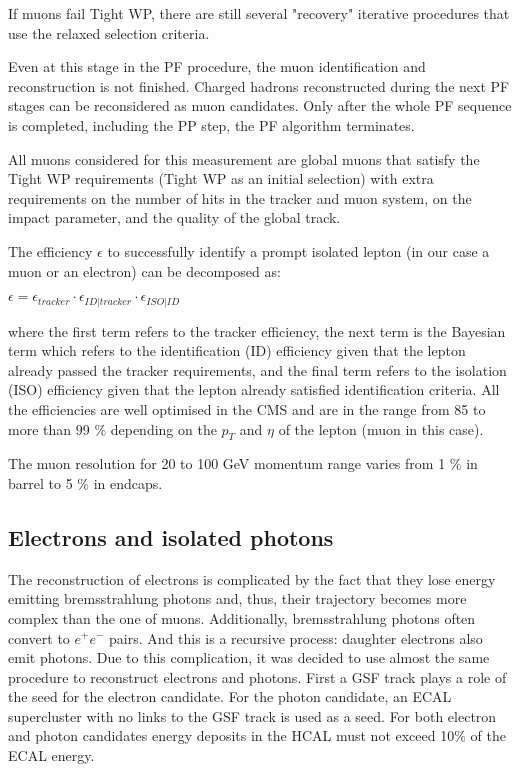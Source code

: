 \begin{small}
If muons fail Tight WP, there are still several "recovery" iterative procedures that use the relaxed selection criteria. 

Even at this stage in the PF procedure, the muon identification and reconstruction is not finished. Charged hadrons reconstructed during the next PF stages can be reconsidered as muon candidates. Only after the whole PF sequence is completed, including the PP step, the PF algorithm terminates.

All muons considered for this measurement are global muons that satisfy the Tight WP requirements (Tight WP as an initial selection) with extra requirements on the number of hits in the tracker and muon system, on the impact parameter, and the quality of the global track. 

The efficiency $\epsilon$ to successfully identify a prompt isolated lepton (in our case a muon or an electron) can be decomposed as:

$\epsilon = \epsilon_{tracker} \cdot \epsilon_{ID | tracker} \cdot \epsilon_{ISO | ID} $

\noindent where the first term refers to the tracker efficiency, the next term is the Bayesian term which refers to the identification (ID) efficiency given that the lepton already passed the tracker requirements, and the final term refers to the isolation (ISO) efficiency given that the lepton already satisfied identification criteria. All the efficiencies are well optimised in the CMS and are in the range from 85 to more than 99 $\%$ depending on the $p_T$ and $\eta$ of the lepton (muon in this case). 

The muon resolution for 20 to 100 GeV momentum range varies from 1 $\%$ in barrel to 5 $\%$ in endcaps.

\subsection{Electrons and isolated photons}\label{sec:electrons}

The reconstruction of electrons is complicated by the fact that they lose energy emitting bremsstrahlung photons and, thus, their trajectory becomes more complex than the one of muons. Additionally, bremsstrahlung photons often convert to $e^+ e^-$ pairs. And this is a recursive process: daughter electrons also emit photons. Due to this complication, it was decided to use almost the same procedure to reconstruct electrons and photons. First a GSF track plays a role of the seed for the electron candidate. For the photon candidate, an ECAL supercluster with no links to the GSF track is used as a seed. For both electron and photon candidates energy deposits in the HCAL must not exceed 10$\%$ of the ECAL energy. 


\end{small}
